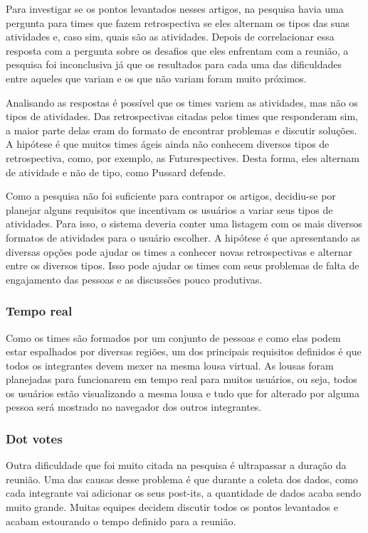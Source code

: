 Para investigar se os pontos levantados nesses artigos, na pesquisa havia uma pergunta para times que fazem retrospectiva se eles alternam os tipos das suas atividades e, caso sim, quais são as atividades. Depois de correlacionar essa resposta com a pergunta sobre os desafios que eles enfrentam com a reunião, a pesquisa foi inconclusiva já que os resultados para cada uma das dificuldades entre aqueles que variam e os que não variam foram muito próximos.

Analisando as respostas é possível que os times variem as atividades, mas não os tipos de atividades. Das retrospectivas citadas pelos times que responderam sim, a maior parte delas eram do formato de encontrar problemas e discutir soluções. A hipótese é que muitos times ágeis ainda não conhecem diversos tipos de retrospectiva, como, por exemplo, as Futurespectives. Desta forma, eles alternam de atividade e não de tipo, como Pussard defende.

Como a pesquisa não foi suficiente para contrapor os artigos, decidiu-se por planejar alguns requisitos que incentivam os usuários a variar seus tipos de atividades. Para isso, o sistema deveria conter uma listagem com os mais diversos formatos de atividades para o usuário escolher. A hipótese é que apresentando as diversas opções pode ajudar os times a conhecer novas retrospectivas e alternar entre os diversos tipos. Isso pode ajudar os times com seus problemas de falta de engajamento das pessoas e as discussões pouco produtivas.

\subsubsection*{Tempo real}

Como os times são formados por um conjunto de pessoas e como elas podem estar espalhados por diversas regiões, um dos principais requisitos definidos é que todos os integrantes devem mexer na mesma lousa virtual. As lousas foram planejadas  para funcionarem em tempo real para muitos usuários, ou seja, todos os usuários estão visualizando a mesma lousa e tudo que for alterado por alguma pessoa será mostrado no navegador dos outros integrantes.

\subsubsection*{Dot votes}

Outra dificuldade que foi muito citada na pesquisa é ultrapassar a duração da reunião. Uma das causas desse problema é que durante a coleta dos dados, como cada integrante vai adicionar os seus post-its, a quantidade de dados acaba sendo muito grande. Muitas equipes decidem discutir todos os pontos levantados e acabam estourando o tempo definido para a reunião.

